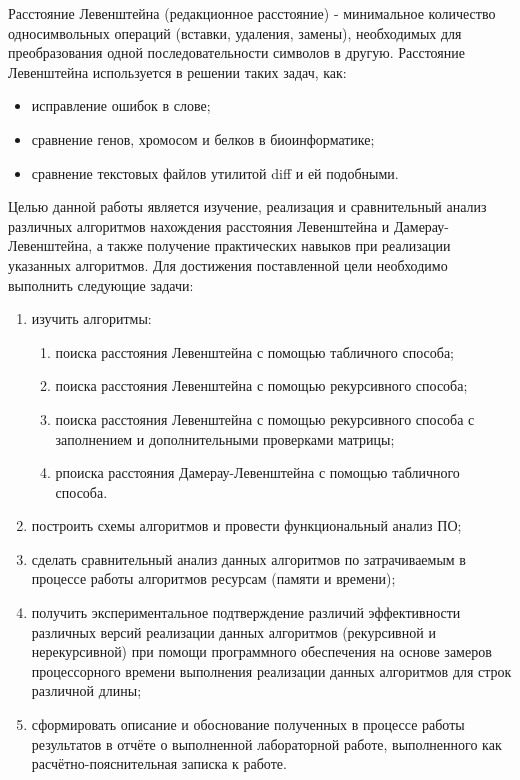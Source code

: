 \Introduction
Расстояние Левенштейна (редакционное расстояние) - минимальное количество односимвольных операций (вставки, удаления, замены), необходимых для преобразования одной последовательности символов в другую. 
Расстояние Левенштейна используется в решении таких задач, как:
\begin{itemize}
	\item исправление ошибок в слове;
	\item сравнение генов, хромосом и белков в биоинформатике;
	\item сравнение текстовых файлов утилитой diff и ей подобными.
\end{itemize}

Целью данной работы является изучение, реализация и сравнительный анализ различных алгоритмов нахождения расстояния Левенштейна и Дамерау-Левенштейна, а также получение практических навыков при реализации указанных алгоритмов. Для достижения поставленной цели необходимо выполнить следующие задачи:
\begin{enumerate} 
	\item изучить алгоритмы:
	\begin{enumerate} 
		\item поиска расстояния Левенштейна с помощью табличного способа;
		\item поиска расстояния Левенштейна с помощью рекурсивного способа;
		\item поиска расстояния Левенштейна с помощью рекурсивного способа с заполнением и дополнительными проверками матрицы;
		\item рпоиска расстояния Дамерау-Левенштейна с помощью табличного способа.
	\end{enumerate}
	\item построить схемы алгоритмов и провести функциональный анализ ПО;
	\item сделать сравнительный анализ данных алгоритмов по затрачиваемым в процессе работы алгоритмов ресурсам (памяти и времени);
	\item получить экспериментальное подтверждение различий эффективности различных версий реализации данных алгоритмов (рекурсивной и нерекурсивной) при помощи программного обеспечения на основе замеров процессорного времени выполнения реализации данных алгоритмов для строк различной длины;
	\item сформировать описание и обоснование полученных в процессе работы результатов в отчёте о выполненной лабораторной работе, выполненного как расчётно-пояснительная записка к работе.
\end{enumerate}
